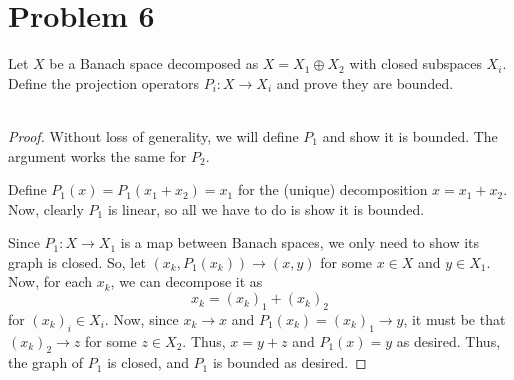 \documentclass[fontsize=11pt]{scrartcl} %
\numberwithin{equation}{section} %
\numberwithin{figure}{section} %
\numberwithin{table}{section} %
\begin{document}
\section*{Problem 6}
Let $X$ be a Banach space decomposed as $X=X_1\oplus X_2$ with closed subspaces
$X_i$.
Define the projection operators $P_i:X\to X_i$ and prove they are bounded.
\\
\\
\begin{proof}
    Without loss of generality, we will define $P_1$ and show it is bounded. The
    argument works the same for $P_2$.

    Define $P_1(x) = P_1(x_1+x_2) = x_1$ for the (unique) decomposition
    $x=x_1+x_2$. Now, clearly $P_1$ is linear, so all we have to do is show it
    is bounded.

    Since $P_1:X\to X_1$ is a map between Banach spaces, we only need to show
    its graph is closed. So, let $(x_k, P_1(x_k))\to (x,y)$ for some $x\in X$
    and $y\in X_1$. Now, for each $x_k$, we can decompose it as
    \[
        x_k = (x_k)_1 + (x_k)_2
    \]
    for $(x_k)_i\in X_i$. Now, since $x_k\to x$ and $P_1(x_k) = (x_k)_1\to y$,
    it must be that $(x_k)_2\to z$ for some $z\in X_2$. Thus, $x = y+z$ and
    $P_1(x) = y$ as desired. Thus, the graph of $P_1$ is closed, and $P_1$ is
    bounded as desired.
\end{proof}
\end{document}
